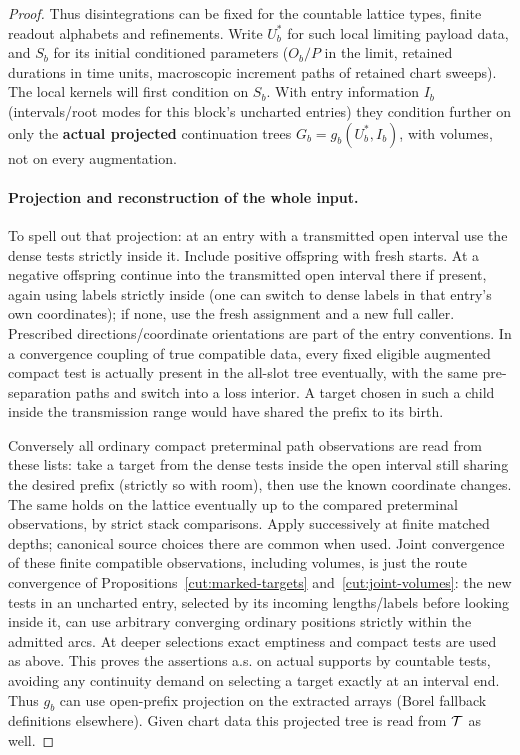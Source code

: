 \begin{proof}
Thus disintegrations can be fixed for the countable
lattice types, finite readout alphabets and refinements. Write \(U_b^*\) for such local limiting payload
data, and \(S_b\) for its initial conditioned parameters (\(O_b/P\) in the limit, retained durations in time
units, macroscopic increment paths of retained chart sweeps). The local kernels will first condition on
\(S_b\). With entry information \(I_b\) (intervals/root modes for this block's uncharted entries) they
condition further on only the \textbf{actual projected} continuation trees \(G_b=g_b(U_b^*,I_b)\), with
volumes, not on every augmentation.

\paragraph{Projection and reconstruction of the whole input.}

To spell out that projection: at an entry with a transmitted open interval use the dense tests strictly
inside it. Include positive offspring with fresh starts. At a negative offspring continue into the
transmitted open interval there if present, again using labels strictly inside (one can switch to dense
labels in that entry's own coordinates); if none, use the fresh assignment and a new full caller. Prescribed
directions/coordinate orientations are part of the entry conventions. In a convergence coupling of true
compatible data, every fixed eligible augmented compact test is actually present in the all-slot tree
eventually, with the same pre-separation paths and switch into a loss interior. A target chosen in such a
child inside the transmission range would have shared the prefix to its birth.

Conversely all ordinary
compact preterminal path observations are read from these lists: take a target from the dense tests inside
the open interval still sharing the desired prefix (strictly so with room), then use the known coordinate
changes. The same holds on the lattice eventually up to the compared preterminal observations, by strict
stack comparisons. Apply successively at finite matched depths; canonical source choices there are common
when used. Joint convergence of these finite compatible observations, including volumes, is just the
route convergence of Propositions~\ref{cut:marked-targets} and~\ref{cut:joint-volumes}: the new tests in an uncharted entry, selected by its incoming lengths/labels
before looking inside it, can use arbitrary converging ordinary positions strictly within the admitted arcs.
At deeper selections exact emptiness and compact tests are used as above. This proves the assertions a.s. on
actual supports by countable tests, avoiding any continuity demand on selecting a target exactly at an
interval end. Thus \(g_b\) can use open-prefix projection on the extracted arrays (Borel fallback
definitions elsewhere). Given chart data this projected tree is read from \({\cal T}\) as well.


\end{proof}
